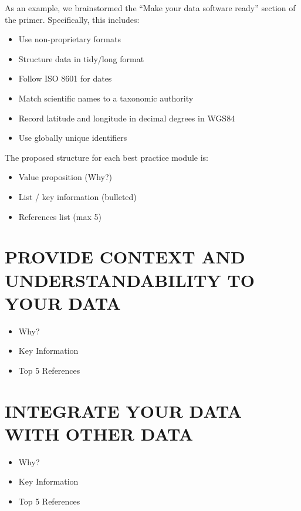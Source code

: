 \documentclass[
  oneside]{book}
\providecommand{\tightlist}{%
  \setlength{\itemsep}{0pt}\setlength{\parskip}{0pt}}
\begin{document}
\newpage

As an example, we brainstormed the ``Make your data software ready'' section of the primer. Specifically, this includes:

\begin{itemize}
\tightlist
\item
  Use non-proprietary formats
\item
  Structure data in tidy/long format
\item
  Follow ISO 8601 for dates
\item
  Match scientific names to a taxonomic authority
\item
  Record latitude and longitude in decimal degrees in WGS84
\item
  Use globally unique identifiers
\end{itemize}

The proposed structure for each best practice module is:

\begin{itemize}
\tightlist
\item
  Value proposition (Why?)
\item
  List / key information (bulleted)
\item
  References list (max 5)
\end{itemize}

\hypertarget{provide-context-and-understandability-to-your-data}{%
\chapter{PROVIDE CONTEXT AND UNDERSTANDABILITY TO YOUR DATA}\label{provide-context-and-understandability-to-your-data}}

\begin{itemize}
\tightlist
\item
  Why?
\item
  Key Information
\item
  Top 5 References
\end{itemize}

\hypertarget{integrate-your-data-with-other-data}{%
\chapter{INTEGRATE YOUR DATA WITH OTHER DATA}\label{integrate-your-data-with-other-data}}

\begin{itemize}
\tightlist
\item
  Why?
\item
  Key Information
\item
  Top 5 References
\end{itemize}
\end{document}
